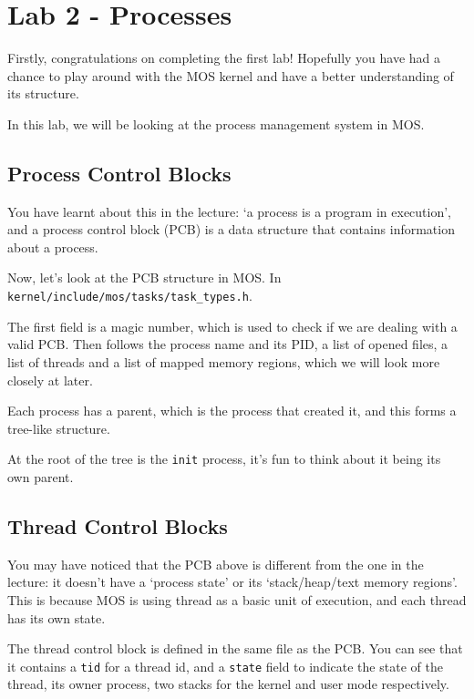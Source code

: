 \chapter{Lab 2 - Processes}


Firstly, congratulations on completing the first lab! Hopefully you have had a chance to play
around with the MOS kernel and have a better understanding of its structure.

In this lab, we will be looking at the process management system in MOS.

\section{Process Control Blocks}

You have learnt about this in the lecture: `a process is a program in execution', and a process
control block (PCB) is a data structure that contains information about a process.

Now, let's look at the PCB structure in MOS. In \texttt{kernel/include/mos/tasks/task\_types.h}.

The first field is a magic number, which is used to check if we are dealing with a valid PCB.
Then follows the process name and its PID, a list of opened files, a list of threads and a list
of mapped memory regions, which we will look more closely at later.

Each process has a parent, which is the process that created it, and this forms a tree-like
structure.

\begin{note}
    \item At the root of the tree is the \texttt{init} process, it's fun to think about
    it being its own parent.
\end{note}

\section{Thread Control Blocks}

You may have noticed that the PCB above is different from the one in the lecture: it doesn't
have a `process state' or its `stack/heap/text memory regions'. This is because MOS is using
thread as a basic unit of execution, and each thread has its own state.

The thread control block is defined in the same file as the PCB. You can see that it contains
a \texttt{tid} for a thread id, and a \texttt{state} field to indicate the state of the thread,
its owner process, two stacks for the kernel and user mode respectively.

